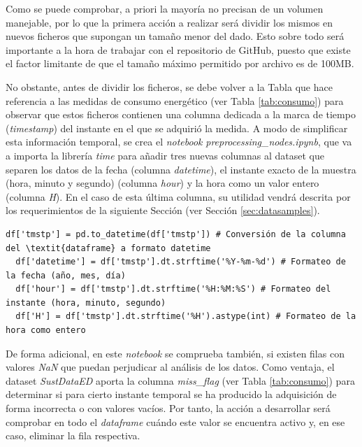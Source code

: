 \pagebreak

Como se puede comprobar, a priori la mayoría no precisan de un volumen manejable, por lo que la primera acción a realizar será dividir los mismos en nuevos ficheros que supongan un tamaño menor del dado. Esto sobre todo será importante a la hora de trabajar con el repositorio de GitHub, puesto que existe el factor limitante de que el tamaño máximo permitido por archivo es de 100MB. 

\vspace{3mm}

No obstante, antes de dividir los ficheros, se debe volver a la Tabla que hace referencia a las medidas de consumo energético (ver Tabla \ref{tab:consumo}) para observar que estos ficheros contienen una columna dedicada a la marca de tiempo (\textit{timestamp}) del instante en el que se adquirió la medida. A modo de simplificar esta información temporal, se crea el \textit{notebook} \textit{preprocessing\_nodes.ipynb}, que va a importa la librería \textit{time} para añadir tres nuevas columnas al dataset que separen los datos de la fecha (columna \textit{datetime}), el instante exacto de la muestra (hora, minuto y segundo) (columna \textit{hour}) y la hora como un valor entero (columna \textit{H}). En el caso de esta última columna, su utilidad vendrá descrita por los requerimientos de la siguiente Sección (ver Sección \ref{sec:datasamples}).

\vspace{3mm}

\begin{lstlisting}[style=Python-color, caption={Formato del timestamp}]
  df['tmstp'] = pd.to_datetime(df['tmstp']) # Conversión de la columna del \textit{dataframe} a formato datetime
  df['datetime'] = df['tmstp'].dt.strftime('%Y-%m-%d') # Formateo de la fecha (año, mes, día)
  df['hour'] = df['tmstp'].dt.strftime('%H:%M:%S') # Formateo del instante (hora, minuto, segundo)
  df['H'] = df['tmstp'].dt.strftime('%H').astype(int) # Formateo de la hora como entero
\end{lstlisting}

\vspace{3mm}

De forma adicional, en este \textit{notebook} se comprueba también, si existen filas con valores \textit{NaN} que puedan perjudicar al análisis de los datos. Como ventaja, el dataset \textit{SustDataED} aporta la columna \textit{miss\_flag} (ver Tabla \ref{tab:consumo}) para determinar si para cierto instante temporal se ha producido la adquisición de forma incorrecta o con valores vacíos. Por tanto, la acción a desarrollar será comprobar en todo el \textit{dataframe} cuándo este valor se encuentra activo y, en ese caso, eliminar la fila respectiva.

